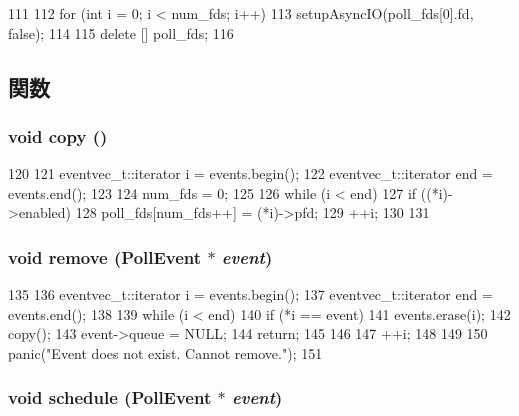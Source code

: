 \begin{DoxyCode}
111 {
112     for (int i = 0; i < num_fds; i++)
113         setupAsyncIO(poll_fds[0].fd, false);
114 
115     delete [] poll_fds;
116 }
\end{DoxyCode}


\subsection{関数}
\hypertarget{classPollQueue_aaa6c087511a52e64fc9ad92820c7c0a8}{
\subsubsection[{copy}]{\setlength{\rightskip}{0pt plus 5cm}void copy ()}}
\label{classPollQueue_aaa6c087511a52e64fc9ad92820c7c0a8}



\begin{DoxyCode}
120 {
121     eventvec_t::iterator i = events.begin();
122     eventvec_t::iterator end = events.end();
123 
124     num_fds = 0;
125 
126     while (i < end) {
127         if ((*i)->enabled)
128             poll_fds[num_fds++] = (*i)->pfd;
129         ++i;
130     }
131 }
\end{DoxyCode}
\hypertarget{classPollQueue_a4b43e98813c26772adf0d7488dfa1887}{
\subsubsection[{remove}]{\setlength{\rightskip}{0pt plus 5cm}void remove ({\bf PollEvent} $\ast$ {\em event})}}
\label{classPollQueue_a4b43e98813c26772adf0d7488dfa1887}



\begin{DoxyCode}
135 {
136     eventvec_t::iterator i = events.begin();
137     eventvec_t::iterator end = events.end();
138 
139     while (i < end) {
140         if (*i == event) {
141            events.erase(i);
142            copy();
143            event->queue = NULL;
144            return;
145         }
146 
147         ++i;
148     }
149 
150     panic("Event does not exist.  Cannot remove.");
151 }
\end{DoxyCode}
\hypertarget{classPollQueue_a3f09bc14c53cce046dfdc7d11c96bb72}{
\subsubsection[{schedule}]{\setlength{\rightskip}{0pt plus 5cm}void schedule ({\bf PollEvent} $\ast$ {\em event})}}
\label{classPollQueue_a3f09bc14c53cce046dfdc7d11c96bb72}



